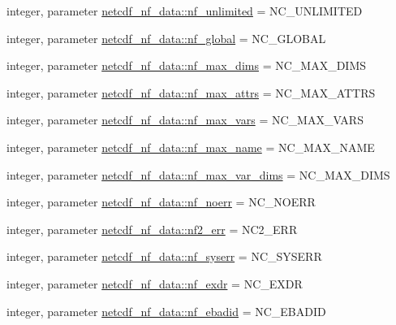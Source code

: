 \begin{DoxyCompactItemize}
\item 
integer, parameter \hyperlink{namespacenetcdf__nf__data_a4897b8e7d6863dc359b217d9a1826167}{netcdf\+\_\+nf\+\_\+data\+::nf\+\_\+unlimited} = N\+C\+\_\+\+U\+N\+L\+I\+M\+I\+T\+ED
\item 
integer, parameter \hyperlink{namespacenetcdf__nf__data_a8762f96827f890e2c127c2e2fbfae8cd}{netcdf\+\_\+nf\+\_\+data\+::nf\+\_\+global} = N\+C\+\_\+\+G\+L\+O\+B\+AL
\item 
integer, parameter \hyperlink{namespacenetcdf__nf__data_a62dee4845e079e42d75d85764480a527}{netcdf\+\_\+nf\+\_\+data\+::nf\+\_\+max\+\_\+dims} = N\+C\+\_\+\+M\+A\+X\+\_\+\+D\+I\+MS
\item 
integer, parameter \hyperlink{namespacenetcdf__nf__data_a3f6563baafe2dee829da95ebee9cce4f}{netcdf\+\_\+nf\+\_\+data\+::nf\+\_\+max\+\_\+attrs} = N\+C\+\_\+\+M\+A\+X\+\_\+\+A\+T\+T\+RS
\item 
integer, parameter \hyperlink{namespacenetcdf__nf__data_a9fd743aeebaed691ce9dbfa0313c1dac}{netcdf\+\_\+nf\+\_\+data\+::nf\+\_\+max\+\_\+vars} = N\+C\+\_\+\+M\+A\+X\+\_\+\+V\+A\+RS
\item 
integer, parameter \hyperlink{namespacenetcdf__nf__data_aa18f154c8912d6353abc73ac7e69545a}{netcdf\+\_\+nf\+\_\+data\+::nf\+\_\+max\+\_\+name} = N\+C\+\_\+\+M\+A\+X\+\_\+\+N\+A\+ME
\item 
integer, parameter \hyperlink{namespacenetcdf__nf__data_ae2feef7fecd896c04caea95954896648}{netcdf\+\_\+nf\+\_\+data\+::nf\+\_\+max\+\_\+var\+\_\+dims} = N\+C\+\_\+\+M\+A\+X\+\_\+\+D\+I\+MS
\item 
integer, parameter \hyperlink{namespacenetcdf__nf__data_a4ecd2f28d20446daf2b7b3f4f8122a34}{netcdf\+\_\+nf\+\_\+data\+::nf\+\_\+noerr} = N\+C\+\_\+\+N\+O\+E\+RR
\item 
integer, parameter \hyperlink{namespacenetcdf__nf__data_a584209e7c8aad290efa2f2ade190414d}{netcdf\+\_\+nf\+\_\+data\+::nf2\+\_\+err} = N\+C2\+\_\+\+E\+RR
\item 
integer, parameter \hyperlink{namespacenetcdf__nf__data_afcbee7a5a51e76aefb4df1c2517a331b}{netcdf\+\_\+nf\+\_\+data\+::nf\+\_\+syserr} = N\+C\+\_\+\+S\+Y\+S\+E\+RR
\item 
integer, parameter \hyperlink{namespacenetcdf__nf__data_a8e8ca93d019190a92a16be656ca4b82d}{netcdf\+\_\+nf\+\_\+data\+::nf\+\_\+exdr} = N\+C\+\_\+\+E\+X\+DR
\item 
integer, parameter \hyperlink{namespacenetcdf__nf__data_a4203e361f8b881939c4c46d159e1b53e}{netcdf\+\_\+nf\+\_\+data\+::nf\+\_\+ebadid} = N\+C\+\_\+\+E\+B\+A\+D\+ID

\end{DoxyCompactItemize}

